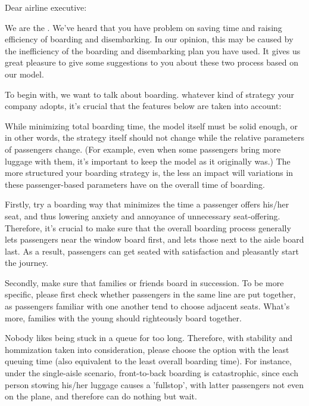\noindent Dear airline executive:

	We are the . We've heard that you have problem on saving time and raising efficiency of boarding and disembarking. In our opinion, this may be caused by the inefficiency of the boarding and disembarking plan you have used. It gives us great pleasure to give some suggestions to you  about these two process based on our model.

	To begin with, we want to talk about boarding. whatever kind of strategy your company adopts, it's crucial that the features below are taken into account:

	\begin{itemize}

		While minimizing total boarding time, the model itself must be solid enough, or in other words, the strategy itself should not change while the relative parameters of passengers change. (For example, even when some passengers bring more luggage with them, it's important to keep the model as it originally was.) The more structured your boarding strategy is, the less an impact will variations in these passenger-based parameters have on the overall time of boarding.

		Firstly, try a boarding way that minimizes the time a passenger offers his/her seat, and thus lowering anxiety and annoyance of unnecessary seat-offering. Therefore, it's crucial to make sure that the overall boarding process generally lets passengers near the window board first, and lets those next to the aisle board last. As a result, passengers can get seated with satisfaction and pleasantly start the journey.

  		Secondly, make sure that families or friends board in succession. To be more specific, please first check whether passengers in the same line are put together, as passengers familiar with one another tend to choose adjacent seats. What's more, families with the young should righteously board together.

		Nobody likes being stuck in a queue for too long. Therefore, with stability and hommization taken into consideration, please choose the option with the least queuing time (also equivalent to the least overall boarding time). For instance, under the single-aisle scenario, front-to-back boarding is catastrophic, since each person stowing his/her luggage causes a 'fullstop', with latter passengers not even on the plane, and therefore can do nothing but wait.


\end{itemize}

